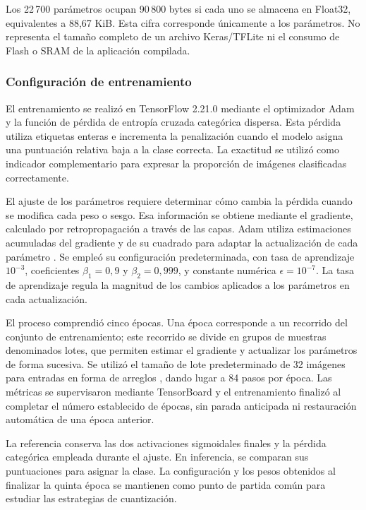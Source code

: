 Los 22\,700 parámetros ocupan 90\,800 bytes si cada uno se almacena en Float32, equivalentes a 88,67 KiB. Esta cifra corresponde únicamente a los parámetros. No representa el tamaño completo de un archivo Keras/TFLite ni el consumo de Flash o SRAM de la aplicación compilada.

\subsubsection{Configuración de entrenamiento}\label{sec:cnn_entrenamiento}
El entrenamiento se realizó en TensorFlow 2.21.0 mediante el optimizador Adam y la función de pérdida de entropía cruzada categórica dispersa. Esta pérdida utiliza etiquetas enteras e incrementa la penalización cuando el modelo asigna una puntuación relativa baja a la clase correcta. La exactitud se utilizó como indicador complementario para expresar la proporción de imágenes clasificadas correctamente.

El ajuste de los parámetros requiere determinar cómo cambia la pérdida cuando se modifica cada peso o sesgo. Esa información se obtiene mediante el gradiente, calculado por retropropagación a través de las capas. Adam utiliza estimaciones acumuladas del gradiente y de su cuadrado para adaptar la actualización de cada parámetro \cite{adam}. Se empleó su configuración predeterminada, con tasa de aprendizaje $10^{-3}$, coeficientes $\beta_1=0,9$ y $\beta_2=0,999$, y constante numérica $\epsilon=10^{-7}$. La tasa de aprendizaje regula la magnitud de los cambios aplicados a los parámetros en cada actualización.

El proceso comprendió cinco épocas. Una época corresponde a un recorrido del conjunto de entrenamiento; este recorrido se divide en grupos de muestras denominados lotes, que permiten estimar el gradiente y actualizar los parámetros de forma sucesiva. Se utilizó el tamaño de lote predeterminado de 32 imágenes para entradas en forma de arreglos \cite{kerasfit}, dando lugar a 84 pasos por época. Las métricas se supervisaron mediante TensorBoard y el entrenamiento finalizó al completar el número establecido de épocas, sin parada anticipada ni restauración automática de una época anterior.

La referencia conserva las dos activaciones sigmoidales finales y la pérdida categórica empleada durante el ajuste. En inferencia, se comparan sus puntuaciones para asignar la clase. La configuración y los pesos obtenidos al finalizar la quinta época se mantienen como punto de partida común para estudiar las estrategias de cuantización.


